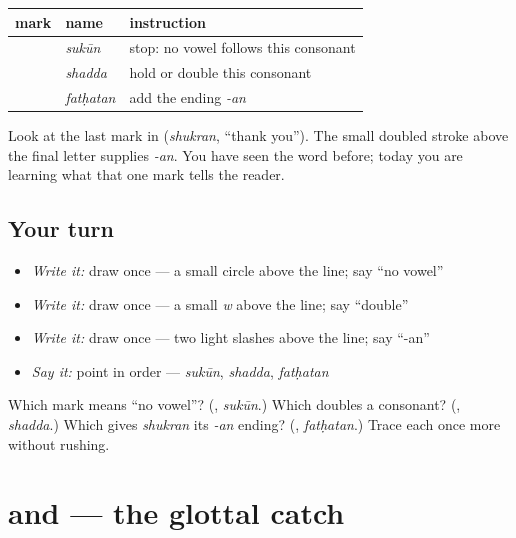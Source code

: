 \noindent
\begin{tabularx}{\linewidth}{@{}>{\raggedright\arraybackslash}X>{\raggedright\arraybackslash}X>{\raggedright\arraybackslash}X@{}}
\toprule
\textbf{mark} & \textbf{name} & \textbf{instruction} \\
\midrule
\textbf{\ar{ْ}} & \emph{sukūn} & stop: no vowel follows this consonant \\
\textbf{\ar{ّ}} & \emph{shadda} & hold or double this consonant \\
\textbf{\ar{ً}} & \emph{fatḥatan} & add the ending \emph{-an} \\
\bottomrule
\end{tabularx}

Look at the last mark in \textbf{} (\emph{shukran}, “thank you”). The small doubled stroke above the final letter supplies \emph{-an}. You have seen the word before; today you are learning what that one mark tells the reader.

\subsection*{Your turn}
\begin{itemize}
\raggedright
  \item \emph{Write it:} draw \textbf{} once — a small circle above the line; say “no vowel”
  \item \emph{Write it:} draw \textbf{} once — a small \emph{w} above the line; say “double”
  \item \emph{Write it:} draw \textbf{} once — two light slashes above the line; say “-an”
  \item \emph{Say it:} point in order — \emph{sukūn}, \emph{shadda}, \emph{fatḥatan}
\end{itemize}

\begin{tcolorbox}[breakable,colback=teal!4,colframe=teal!35!black,title={Before you move on}]
Which mark means “no vowel”? (\textbf{}, \emph{sukūn}.) Which doubles a consonant? (\textbf{}, \emph{shadda}.) Which gives \emph{shukran} its \emph{-an} ending? (\textbf{}, \emph{fatḥatan}.) Trace each once more without rushing.
\end{tcolorbox}
\section[\texorpdfstring{\ar{ء،} \ar{أ} (hamza)}{ء، أ (hamza)}]{ and  — the glottal catch}

